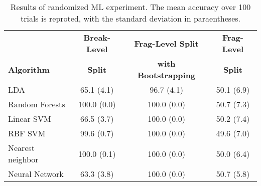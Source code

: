 \documentclass{article}
\begin{document}
\begin{table}[t!]
\vspace{-3mm}
\caption{Results of randomized ML experiment. The mean accuracy over 100 trials is reproted, with the standard deviation in paraentheses.}
\vspace{-3mm}
\label{tab:rand}
\vskip 0.15in
\begin{center}
\begin{small}
\begin{sc}
\begin{tabular}{lccc}
\toprule
& {\bf Break-Level} & {\bf Frag-Level Split} & {\bf Frag-Level}\\ 
{\bf Algorithm} & {\bf Split} & {\bf with Bootstrapping} &{\bf Split} \\ 
\midrule
LDA& 65.1 (4.1)& 96.7 (4.1)& 50.1 (6.9)\\ 
Random Forests& 100.0 (0.0)& 100.0 (0.0)& 50.7 (7.3)\\ 
Linear SVM& 66.5 (3.7)& 100.0 (0.0)& 50.2 (7.4)\\ 
RBF SVM& 99.6 (0.7)& 100.0 (0.0)& 49.6 (7.0)\\ 
Nearest neighbor& 100.0 (0.1)& 100.0 (0.0)& 50.0 (6.4)\\ 
Neural Network& 63.3 (3.8)& 100.0 (0.0)& 50.7 (5.8)\\ 
\bottomrule
\end{tabular}
\end{sc}
\end{small}
\end{center}
\vskip -0.1in
\end{table}
\end{document}
